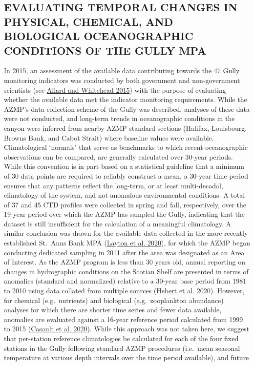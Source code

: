 \documentclass[12pt]{article}\usepackage[]{graphicx}\usepackage[]{color}
\begin{document}
\hypertarget{evaluating-temporal-changes-in-physical-chemical-and-biological-oceanographic-conditions-of-the-gully-mpa}{%
\subsection{\texorpdfstring{\textbf{EVALUATING TEMPORAL CHANGES IN PHYSICAL, CHEMICAL, AND BIOLOGICAL OCEANOGRAPHIC CONDITIONS OF THE GULLY MPA}}{EVALUATING TEMPORAL CHANGES IN PHYSICAL, CHEMICAL, AND BIOLOGICAL OCEANOGRAPHIC CONDITIONS OF THE GULLY MPA}}\label{evaluating-temporal-changes-in-physical-chemical-and-biological-oceanographic-conditions-of-the-gully-mpa}}

In 2015, an assessment of the available data contributing towards the 47 Gully monitoring indicators was conducted by both government and non-government scientists (see \protect\hyperlink{ref-allard_2015}{Allard and Whitehead 2015}) with the purpose of evaluating whether the available data met the indicator monitoring requirements. While the AZMP's data collection scheme of the Gully was described, analyses of these data were not conducted, and long-term trends in oceanographic conditions in the canyon were inferred from nearby AZMP standard sections (Halifax, Louisbourg, Browns Bank, and Cabot Strait) where baseline values were available. Climatological `normals' that serve as benchmarks to which recent oceanographic observations can be compared, are generally calculated over 30-year periods. While this convention is in part based on a statistical guideline that a minimum of 30 data points are required to reliably construct a mean, a 30-year time period ensures that any patterns reflect the long-term, or at least multi-decadal, climatology of the system, and not anomalous environmental conditions. A total of 37 and 45 CTD profiles were collected in spring and fall, respectively, over the 19-year period over which the AZMP has sampled the Gully, indicating that the dataset is still insufficient for the calculation of a meaningful climatology. A similar conclusion was drawn for the available data collected in the more recently-established St.~Anns Bank MPA (\protect\hyperlink{ref-layton_2020}{Layton et al. 2020}), for which the AZMP began conducting dedicated sampling in 2011 after the area was designated as an Area of Interest. As the AZMP program is less than 30 years old, annual reporting on changes in hydrographic conditions on the Scotian Shelf are presented in terms of anomalies (standard and normalized) relative to a 30-year base period from 1981 to 2010 using data collated from multiple sources (\protect\hyperlink{ref-hebert_2020}{Hebert et al. 2020}). However, for chemical (e.g.~nutrients) and biological (e.g.~zooplankton abundance) analyses for which there are shorter time series and fewer data available, anomalies are evaluated against a 16-year reference period calculated from 1999 to 2015 (\protect\hyperlink{ref-casault_2020}{Casault et al. 2020}). While this approach was not taken here, we suggest that per-station reference climatologies be calculated for each of the four fixed stations in the Gully following standard AZMP procedures (i.e.~mean seasonal temperature at various depth intervals over the time period available), and future 
\end{document}
